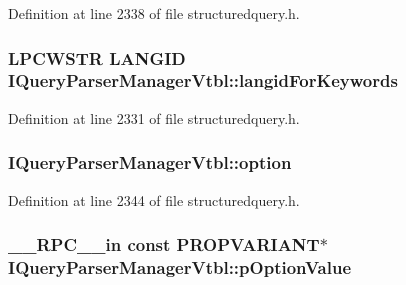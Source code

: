 Definition at line 2338 of file structuredquery.\+h.

\subsubsection[{\texorpdfstring{langid\+For\+Keywords}{langidForKeywords}}]{ {\bf L\+P\+C\+W\+S\+TR} L\+A\+N\+G\+ID I\+Query\+Parser\+Manager\+Vtbl\+::langid\+For\+Keywords}\hypertarget{struct_i_query_parser_manager_vtbl_af0a82570e6701f5ff971f47515bd3ece}{}\label{struct_i_query_parser_manager_vtbl_af0a82570e6701f5ff971f47515bd3ece}


Definition at line 2331 of file structuredquery.\+h.

\subsubsection[{\texorpdfstring{option}{option}}]{ I\+Query\+Parser\+Manager\+Vtbl\+::option}\hypertarget{struct_i_query_parser_manager_vtbl_a8e352c2edd5aa5f48f2acc5149aa537a}{}\label{struct_i_query_parser_manager_vtbl_a8e352c2edd5aa5f48f2acc5149aa537a}


Definition at line 2344 of file structuredquery.\+h.

\subsubsection[{\texorpdfstring{p\+Option\+Value}{pOptionValue}}]{ {\bf \+\_\+\+\_\+\+R\+P\+C\+\_\+\+\_\+in} {\bf const} {\bf P\+R\+O\+P\+V\+A\+R\+I\+A\+NT}$\ast$ I\+Query\+Parser\+Manager\+Vtbl\+::p\+Option\+Value}\hypertarget{struct_i_query_parser_manager_vtbl_a70d85e8ea018d49aad51d1ebd77cb8fb}{}\label{struct_i_query_parser_manager_vtbl_a70d85e8ea018d49aad51d1ebd77cb8fb}


